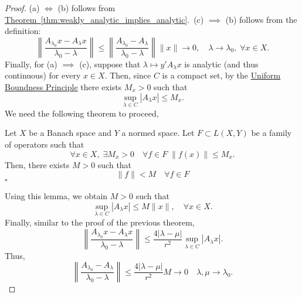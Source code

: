 \begin{proof}
    (a) $\iff$ (b) follows from \hyperref[thm:weakly_analytic_implies_analytic]{Theorem~\ref*{thm:weakly_analytic_implies_analytic}}.~(c) $\implies$ (b) follows from the definition:
    \[ \left\| \frac{A_{\lambda_0}x - A_\lambda x}{\lambda_0 - \lambda} \right\| \leq \left\| \frac{A_{\lambda_0} - A_\lambda}{\lambda_0 - \lambda} \right\| \|x\| \to 0,\quad \lambda\to \lambda_0,\;\forall x \in X. \]
    Finally, for (a) $\implies$ (c), suppose that $\lambda \mapsto y' A_\lambda x$ is analytic (and thus continuous) for every $x \in X$. Then, since $C$ is a compact set, by the \hyperref[lem:uniform_boundness_principle]{Uniform Boundness Principle} there exists $M_x > 0$ such that 
    \[ \sup_{\lambda \in C} |A_\lambda x| \leq M_x. \]
    We need the following theorem to proceed,
    \begin{lemma}\label{lem:banach_steinhaus}
        Let $X$ be a Banach space and $Y$ a normed space. Let $F \subset L(X,Y)$ be a family of operators such that
        \[  \forall x \in X,\; \exists M_x > 0\quad \forall f\in F\; \|f(x)\| \leq M_x. \]
        Then, there exists $M > 0$ such that
        \[ \|f\| < M\quad \forall f \in F \]
        \hfill $\square$
    \end{lemma}
    Using this lemma, we obtain $M > 0$ such that
    \[ \sup_{\lambda \in C} |A_\lambda x| \leq M \|x\|,\quad \forall x\in X. \]
    Finally, similar to the proof of the previous theorem,
    \[ \left\| \frac{A_{\lambda_0}x - A_{\lambda} x}{\lambda_0 - \lambda} \right\| \leq \frac{4 |\lambda-\mu|}{r^2} \sup_{\lambda \in C} |A_\lambda x| . \]
    Thus,
    \[ \left\| \frac{A_{\lambda_0} - A_{\lambda}}{\lambda_0 - \lambda} \right\| \leq  \frac{4 |\lambda-\mu|}{r^2} M \to 0\quad \lambda,\mu \to \lambda_0.\]
\end{proof}

